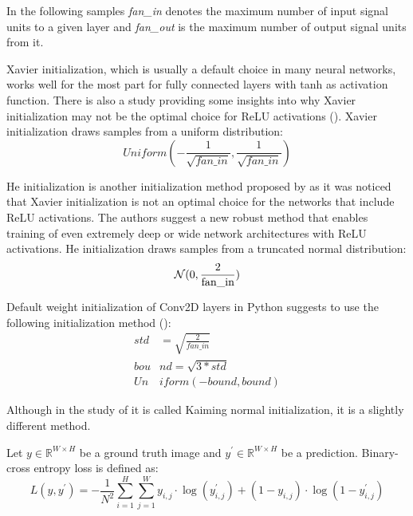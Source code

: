 In the following samples \textit{fan\_in} denotes the maximum number of input signal units to a given layer and \textit{fan\_out} is the maximum number of output signal units from it.

\begin{definition}
	Xavier initialization, which is usually a default choice in many neural networks, works well for the most part for fully connected layers with tanh as activation function. There is also a study providing some insights into why Xavier initialization may not be the optimal choice for ReLU activations (\cite{Kumar_2017}). Xavier initialization draws samples from a uniform distribution:
	\begin{equation}
		Uniform \left(-\frac{1}{\sqrt{fan\_in}}, \frac{1}{\sqrt{fan\_in}}\right)
	\end{equation}
\end{definition}

\begin{definition}[He initialization]
	He initialization is another initialization method proposed by \cite{He_2015} as it was noticed that Xavier initialization is not an optimal choice for the networks that include ReLU activations. The authors suggest a new robust method that enables training of even extremely deep or wide network architectures with ReLU activations. He initialization draws samples from a truncated normal distribution:
	\begin{equation}
		{\cal N}(0, \frac{2}{\text{fan\_in}})
	\end{equation}
\end{definition}

Default weight initialization of Conv2D layers in Python suggests to use the following initialization method (\cite{He_2015}):
\begin{align}
	std &= \sqrt{\frac{2}{fan\_in}} \\
	bou&nd = \sqrt{3 * std} \\
	Un&iform\left(-bound, bound\right)
\end{align}

Although in the study of \cite{He_2015} it is called Kaiming normal initialization, it is a slightly different method.

\begin{definition}
	Let $y \in \mathbb{R}^{W \times H}$ be a ground truth image and $y^\prime \in \mathbb{R}^{W \times H}$ be a prediction. Binary-cross entropy loss is defined as:
	\begin{equation}
		L(y, y^\prime) = - \frac{1}{N^2}\sum_{i=1}^{H} \sum_{j=1}^{W} y_{i,j} \cdot \log(y_{i, j}^\prime) +  (1 - y_{i, j}) \cdot \log(1 - y_{i, j}^\prime) 
	\end{equation}
\end{definition}

